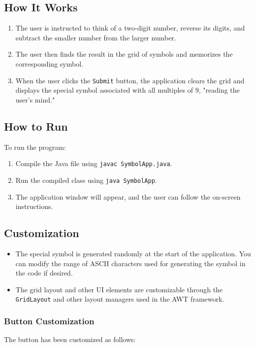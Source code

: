 \documentclass[a4paper,15pt]{article}
\begin{document}
\begin{itemize}[leftmargin=1.5cm]
\subsection{How It Works}
\begin{enumerate}
    \item The user is instructed to think of a two-digit number, reverse its digits, and subtract the smaller number from the larger number.
    \item The user then finds the result in the grid of symbols and memorizes the corresponding symbol.
    \item When the user clicks the \texttt{Submit} button, the application clears the grid and displays the special symbol associated with all multiples of 9, "reading the user's mind."
\end{enumerate}

\subsection{How to Run}
To run the program:
\begin{enumerate}
    \item Compile the Java file using \texttt{javac SymbolApp.java}.
    \item Run the compiled class using \texttt{java SymbolApp}.
    \item The application window will appear, and the user can follow the on-screen instructions.
\end{enumerate}

\subsection{Customization}
\begin{itemize}
    \item The special symbol is generated randomly at the start of the application. You can modify the range of ASCII characters used for generating the symbol in the code if desired.
    \item The grid layout and other UI elements are customizable through the \texttt{GridLayout} and other layout managers used in the AWT framework.
\end{itemize}

\subsubsection{Button Customization}
The button has been customized as follows:


\end{itemize}
\end{document}
